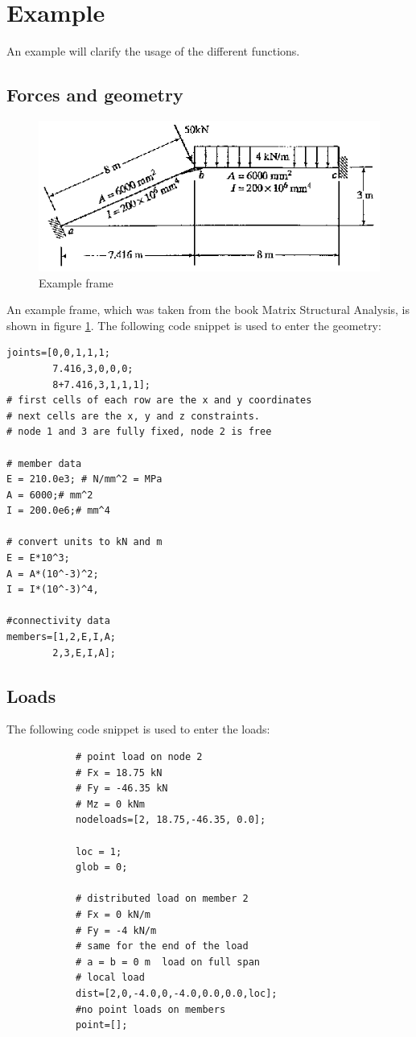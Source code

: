 \documentclass[a4paper]{article}
\begin{document}
\newpage
\section{Example}
	\begin{sloppypar}
	An example will clarify the usage of the different functions.
	\end{sloppypar}
	\subsection{Forces and geometry}
	
		\begin{figure}[h]
			\includegraphics[width=0.75\linewidth]{example5_7.png}
			\caption{Example frame}
			\label{fig:example_frame}
		\end{figure}
		
		\begin{sloppypar}
			An example frame, which was taken from the book Matrix Structural
			Analysis, is shown in figure \ref{fig:example_frame}. 
			The following code snippet is used to enter the geometry:
		\end{sloppypar}
		
		\begin{verbatim}
joints=[0,0,1,1,1;
		7.416,3,0,0,0;
		8+7.416,3,1,1,1];
# first cells of each row are the x and y coordinates
# next cells are the x, y and z constraints. 
# node 1 and 3 are fully fixed, node 2 is free

# member data
E = 210.0e3; # N/mm^2 = MPa
A = 6000;# mm^2
I = 200.0e6;# mm^4

# convert units to kN and m
E = E*10^3;
A = A*(10^-3)^2;
I = I*(10^-3)^4,

#connectivity data
members=[1,2,E,I,A;
		2,3,E,I,A];
		\end{verbatim}
		
	\subsection{Loads}
		\begin{sloppypar}
			The following code snippet is used to enter the loads:
		\end{sloppypar}
		\begin{verbatim}
			# point load on node 2
			# Fx = 18.75 kN
			# Fy = -46.35 kN
			# Mz = 0 kNm
			nodeloads=[2, 18.75,-46.35, 0.0];
			
			loc = 1;
			glob = 0;
			
			# distributed load on member 2
			# Fx = 0 kN/m 
			# Fy = -4 kN/m
			# same for the end of the load
			# a = b = 0 m  load on full span
			# local load
			dist=[2,0,-4.0,0,-4.0,0.0,0.0,loc];
			#no point loads on members
			point=[];
		\end{verbatim}
\end{document}
